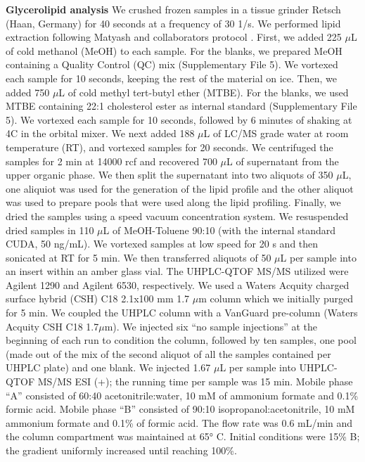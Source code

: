 \documentclass[9pt,twocolumn,twoside,lineno]{BioRxiv}
\begin{document}
\textbf{Glycerolipid analysis} 
We crushed frozen samples in a tissue grinder Retsch (Haan, Germany) for 40 seconds at a frequency of 30 1/s. 
We performed lipid extraction following Matyash and collaborators protocol \cite{Matyash2008-ue}. 
First, we added 225 $\mu$L of cold methanol (MeOH) to each sample. 
For the blanks, we prepared MeOH containing a Quality Control (QC) mix (Supplementary File 5).
We vortexed each sample for 10 seconds, keeping the rest of the material on ice. 
Then, we added 750 $\mu$L of cold methyl tert-butyl ether (MTBE). 
For the blanks, we used MTBE containing 22:1 cholesterol ester as internal standard (Supplementary File 5). 
We vortexed each sample for 10 seconds, followed by 6 minutes of shaking at 4\degree C in the orbital mixer. 
We next added 188 $\mu$L of LC/MS grade water at room temperature (RT), and vortexed samples for 20 seconds.
We centrifuged the samples for 2 min at 14000 rcf and recovered 700 $\mu$L of supernatant from the upper organic phase. 
We then split the supernatant into two aliquots of 350 $\mu$L, one aliquiot was used for the generation of the lipid profile and the other aliquot was used to prepare pools that were used along the lipid profiling. 
Finally, we dried the samples using a speed vacuum concentration system.
We resuspended dried samples in 110 $\mu$L of MeOH-Toluene 90:10 (with the internal standard CUDA, 50 ng/mL). 
We vortexed samples at low speed for 20 s and then sonicated at RT for 5 min. 
We then transferred aliquots of 50 $\mu$L per sample into an insert within an amber glass vial.
The UHPLC-QTOF MS/MS utilized were Agilent 1290 and Agilent 6530, respectively. 
We used a Waters Acquity charged surface hybrid (CSH) C18 2.1x100 mm 1.7 $\mu$m column which we initially purged for 5 min. 
We coupled the UHPLC column with a VanGuard pre-column (Waters Acquity CSH C18 1.7$\mu$m). 
We injected six “no sample injections” at the beginning of each run to condition the column, followed by ten samples, one pool (made out of the mix of the second aliquot of all the samples contained per UHPLC plate) and one blank.
We injected 1.67 $\mu$L per sample into UHPLC-QTOF MS/MS ESI (+); the running time per sample was 15 min. 
Mobile phase “A” consisted of 60:40 acetonitrile:water, 10 mM of ammonium formate and 0.1\% formic acid. 
Mobile phase “B” consisted of 90:10 isopropanol:acetonitrile, 10 mM ammonium formate and 0.1\% of formic acid. 
The flow rate was 0.6 mL/min and the column compartment was maintained at 65° C. Initial conditions were 15\% B; the gradient uniformly increased until reaching 100\%. 
\end{document}
